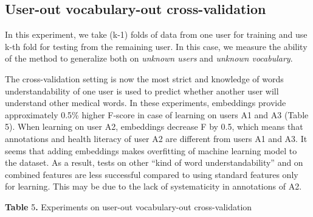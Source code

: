 \subsection{User-out vocabulary-out cross-validation}

\noindent In this experiment, we take (k-1) folds of data from one user for training and use k-th fold for testing from the remaining user. In this case, we measure the ability of the method to generalize both on \textit{unknown users }and\textit{ unknown vocabulary}.

The cross-validation setting is now the most strict and knowledge of words understandability of one user is used to predict whether another user will understand other medical words. In these experiments, embeddings provide approximately 0.5\% higher F-score in case of learning on users A1 and A3 (Table 5). When learning on user A2, embeddings decrease F by 0.5, which means that annotations and health literacy of user A2 are different from users A1 and A3. It seems that adding embeddings makes overfitting of machine learning model to the dataset. As a result, tests on other ``kind of word understandability'' and on combined features are less successful compared to using standard features only for learning. This may be due to the lack of systematicity in annotations of A2.

\noindent \textbf{Table }5\textbf{.} Experiments on user-out vocabulary-out cross-validation

